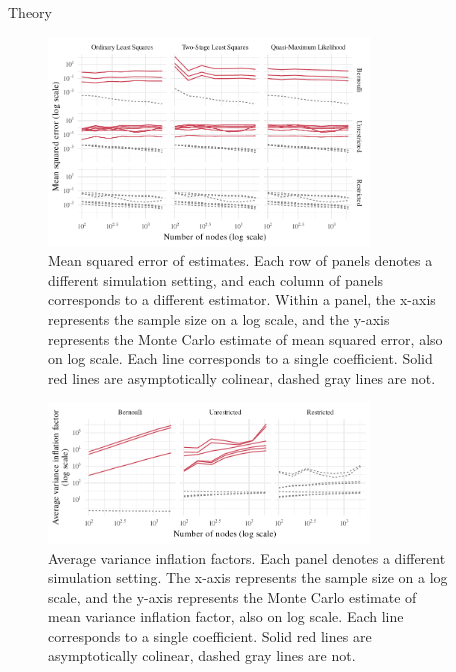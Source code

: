 \documentclass[final]{beamer}
\newlength{\sepwidth}
\newlength{\colwidth}
\newcommand{\separatorcolumn}{\begin{column}{\sepwidth}\end{column}}
\begin{document}
\begin{frame}[t]
\begin{columns}[t]
        \separatorcolumn

        \begin{column}{\colwidth}

            \begin{exampleblock}{Theory}
                \begin{figure}
                    \centering
                    \includegraphics[width=0.8\textwidth]{./figures/simulations/biometrika-mse-all.pdf}
                    \caption{Mean squared error of estimates. Each row of panels denotes a different simulation setting, and each column of panels corresponds to a different estimator. Within a panel, the x-axis represents the sample size on a log scale, and the y-axis represents the Monte Carlo estimate of mean squared error, also on log scale. Each line corresponds to a single coefficient. Solid red lines are asymptotically colinear, dashed gray lines are not.}
                    \label{fig:mse}
                \end{figure}


                \begin{figure}
                    \centering
                    \includegraphics[width=0.8\textwidth]{./figures/simulations/biometrika-vif.pdf}
                    \caption{Average variance inflation factors. Each panel denotes a different simulation setting. The x-axis represents the sample size on a log scale, and the y-axis represents the Monte Carlo estimate of mean variance inflation factor, also on log scale. Each line corresponds to a single coefficient. Solid red lines are asymptotically colinear, dashed gray lines are not.}
                    \label{fig:vif}
                \end{figure}
            \end{exampleblock}


\end{column}
\end{columns}
\end{frame}
\end{document}
